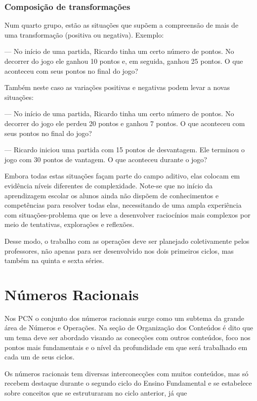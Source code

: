 \subsubsection{Composição de transformações}
Num quarto grupo, estão as situações que supõem a compreensão de mais de uma transformação (positiva ou negativa). Exemplo:

— No início de uma partida, Ricardo tinha um certo número de pontos. No decorrer do jogo ele ganhou 10 pontos e, em seguida, ganhou 25 pontos. O que aconteceu com seus pontos no final do jogo?

Também neste caso as variações positivas e negativas podem levar a novas situações:

— No início de uma partida, Ricardo tinha um certo número de pontos. No decorrer do jogo ele perdeu 20 pontos e ganhou 7 pontos. O que aconteceu com seus pontos no final do jogo?

— Ricardo iniciou uma partida com 15 pontos de desvantagem. Ele terminou o jogo com 30 pontos de vantagem. O que aconteceu durante o jogo?

Embora todas estas situações façam parte do campo aditivo, elas colocam em evidência níveis diferentes de complexidade. Note-se que no início da aprendizagem escolar os alunos ainda não dispõem de conhecimentos e competências para resolver todas elas, necessitando de uma ampla experiência com situações-problema que os leve a desenvolver raciocínios mais complexos por meio de tentativas, explorações e reflexões.

Desse modo, o trabalho com as operações deve ser planejado coletivamente pelos professores, não apenas para ser desenvolvido nos dois primeiros ciclos, mas também na quinta e sexta séries.

\section{Números Racionais}

Nos PCN \cite{brasil2008pde} o conjunto dos números racionais surge como um subtema da grande área de Números e Operações. Na seção de Organização dos Conteúdos é dito que um tema deve ser abordado visando as conecções com outros conteúdos, foco nos pontos mais fundamentais e o nível da profundidade em que será trabalhado em cada um de seus ciclos.

Os números racionais tem diversas interconecções com muitos conteúdos, mas só recebem destaque durante o segundo ciclo do Ensino Fundamental e se estabelece sobre conceitos que se estruturaram no ciclo anterior, já que

